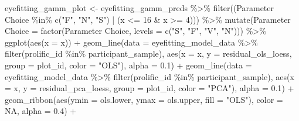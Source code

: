 \documentclass[print]{nuthesis}
\newenvironment{Shaded}{\begin{snugshade}}{\end{snugshade}}
\newcommand{\AttributeTok}[1]{\textcolor[rgb]{0.77,0.63,0.00}{#1}}
\newcommand{\ConstantTok}[1]{\textcolor[rgb]{0.00,0.00,0.00}{#1}}
\newcommand{\DecValTok}[1]{\textcolor[rgb]{0.00,0.00,0.81}{#1}}
\newcommand{\FloatTok}[1]{\textcolor[rgb]{0.00,0.00,0.81}{#1}}
\newcommand{\FunctionTok}[1]{\textcolor[rgb]{0.00,0.00,0.00}{#1}}
\newcommand{\NormalTok}[1]{#1}
\newcommand{\OtherTok}[1]{\textcolor[rgb]{0.56,0.35,0.01}{#1}}
\newcommand{\SpecialCharTok}[1]{\textcolor[rgb]{0.00,0.00,0.00}{#1}}
\newcommand{\StringTok}[1]{\textcolor[rgb]{0.31,0.60,0.02}{#1}}
\begin{document}
\begin{Shaded}
\begin{Highlighting}[]
\NormalTok{eyefitting\_gamm\_plot }\OtherTok{\textless{}{-}}\NormalTok{ eyefitting\_gamm\_preds }\SpecialCharTok{\%\textgreater{}\%}
  \FunctionTok{filter}\NormalTok{((}\StringTok{\textasciigrave{}}\AttributeTok{Parameter Choice}\StringTok{\textasciigrave{}} \SpecialCharTok{\%in\%} \FunctionTok{c}\NormalTok{(}\StringTok{"F"}\NormalTok{, }\StringTok{"N"}\NormalTok{, }\StringTok{"S"}\NormalTok{) }\SpecialCharTok{|}\NormalTok{ (x }\SpecialCharTok{\textless{}=} \DecValTok{16} \SpecialCharTok{\&}\NormalTok{ x }\SpecialCharTok{\textgreater{}=} \DecValTok{4}\NormalTok{))) }\SpecialCharTok{\%\textgreater{}\%}
  \FunctionTok{mutate}\NormalTok{(}\StringTok{\textasciigrave{}}\AttributeTok{Parameter Choice}\StringTok{\textasciigrave{}} \OtherTok{=} \FunctionTok{factor}\NormalTok{(}\StringTok{\textasciigrave{}}\AttributeTok{Parameter Choice}\StringTok{\textasciigrave{}}\NormalTok{, }\AttributeTok{levels =} \FunctionTok{c}\NormalTok{(}\StringTok{"S"}\NormalTok{, }\StringTok{"F"}\NormalTok{, }\StringTok{"V"}\NormalTok{, }\StringTok{"N"}\NormalTok{))) }\SpecialCharTok{\%\textgreater{}\%}
  \FunctionTok{ggplot}\NormalTok{(}\FunctionTok{aes}\NormalTok{(}\AttributeTok{x =}\NormalTok{ x)) }\SpecialCharTok{+}
  \FunctionTok{geom\_line}\NormalTok{(}\AttributeTok{data =}\NormalTok{ eyefitting\_model\_data }\SpecialCharTok{\%\textgreater{}\%} 
              \FunctionTok{filter}\NormalTok{(prolific\_id }\SpecialCharTok{\%in\%}\NormalTok{ participant\_sample), }
            \FunctionTok{aes}\NormalTok{(}\AttributeTok{x =}\NormalTok{ x, }\AttributeTok{y =}\NormalTok{ residual\_ols\_loess, }\AttributeTok{group =}\NormalTok{ plot\_id, }\AttributeTok{color =} \StringTok{"OLS"}\NormalTok{), }\AttributeTok{alpha =} \FloatTok{0.1}\NormalTok{) }\SpecialCharTok{+}
  \FunctionTok{geom\_line}\NormalTok{(}\AttributeTok{data =}\NormalTok{ eyefitting\_model\_data }\SpecialCharTok{\%\textgreater{}\%} 
              \FunctionTok{filter}\NormalTok{(prolific\_id }\SpecialCharTok{\%in\%}\NormalTok{ participant\_sample), }
            \FunctionTok{aes}\NormalTok{(}\AttributeTok{x =}\NormalTok{ x, }\AttributeTok{y =}\NormalTok{ residual\_pca\_loess, }\AttributeTok{group =}\NormalTok{ plot\_id, }\AttributeTok{color =} \StringTok{"PCA"}\NormalTok{), }\AttributeTok{alpha =} \FloatTok{0.1}\NormalTok{) }\SpecialCharTok{+}
  \FunctionTok{geom\_ribbon}\NormalTok{(}\FunctionTok{aes}\NormalTok{(}\AttributeTok{ymin =}\NormalTok{ ols.lower, }\AttributeTok{ymax =}\NormalTok{ ols.upper, }\AttributeTok{fill =} \StringTok{"OLS"}\NormalTok{), }\AttributeTok{color =} \ConstantTok{NA}\NormalTok{, }\AttributeTok{alpha =} \FloatTok{0.4}\NormalTok{) }\SpecialCharTok{+}

\end{Highlighting}
\end{Shaded}
\end{document}
